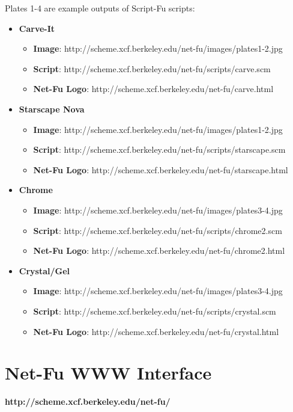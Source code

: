 \documentclass{article}
\begin{document}
Plates 1-4 are example outputs of Script-Fu scripts:
\begin{itemize}
\item {\bf Carve-It}
  \begin{itemize}
  \item {\bf Image}:
  http://scheme.xcf.berkeley.edu/net-fu/images/plates1-2.jpg
  \item {\bf Script}:
  http://scheme.xcf.berkeley.edu/net-fu/scripts/carve.scm
  \item {\bf Net-Fu Logo}:
  http://scheme.xcf.berkeley.edu/net-fu/carve.html
  \end{itemize}
\item {\bf Starscape Nova}
  \begin{itemize}
  \item {\bf Image}:
  http://scheme.xcf.berkeley.edu/net-fu/images/plates1-2.jpg
  \item {\bf Script}:
  http://scheme.xcf.berkeley.edu/net-fu/scripts/starscape.scm
  \item {\bf Net-Fu Logo}:
  http://scheme.xcf.berkeley.edu/net-fu/starscape.html
  \end{itemize}
\item {\bf Chrome}
  \begin{itemize}
  \item {\bf Image}:
  http://scheme.xcf.berkeley.edu/net-fu/images/plates3-4.jpg
  \item {\bf Script}:
  http://scheme.xcf.berkeley.edu/net-fu/scripts/chrome2.scm
  \item {\bf Net-Fu Logo}:
  http://scheme.xcf.berkeley.edu/net-fu/chrome2.html
  \end{itemize}
\item {\bf Crystal/Gel}
  \begin{itemize}
  \item {\bf Image}:
  http://scheme.xcf.berkeley.edu/net-fu/images/plates3-4.jpg
  \item {\bf Script}:
  http://scheme.xcf.berkeley.edu/net-fu/scripts/crystal.scm
  \item {\bf Net-Fu Logo}:
  http://scheme.xcf.berkeley.edu/net-fu/crystal.html
  \end{itemize}
\end{itemize}

\section{Net-Fu WWW Interface}

{\bf http://scheme.xcf.berkeley.edu/net-fu/}
\end{document}
